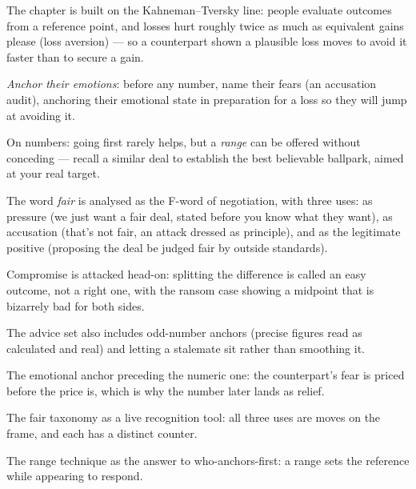 

\begin{distilled}
  \item The chapter is built on the Kahneman--Tversky line: people evaluate outcomes from a reference point, and losses hurt roughly twice as much as equivalent gains please (loss aversion) --- so a counterpart shown a plausible loss moves to avoid it faster than to secure a gain.
  \item \emph{Anchor their emotions}: before any number, name their fears (an accusation audit), anchoring their emotional state in preparation for a loss so they will jump at avoiding it.
  \item On numbers: going first rarely helps, but a \emph{range} can be offered without conceding --- recall a similar deal to establish the best believable ballpark, aimed at your real target.
  \item The word \emph{fair} is analysed as the F-word of negotiation, with three uses: as pressure (we just want a fair deal, stated before you know what they want), as accusation (that's not fair, an attack dressed as principle), and as the legitimate positive (proposing the deal be judged fair by outside standards).
  \item Compromise is attacked head-on: splitting the difference is called an easy outcome, not a right one, with the ransom case showing a midpoint that is bizarrely bad for both sides.
  \item The advice set also includes odd-number anchors (precise figures read as calculated and real) and letting a stalemate sit rather than smoothing it.
\end{distilled}

\begin{unique}
  \item The emotional anchor preceding the numeric one: the counterpart's fear is priced before the price is, which is why the number later lands as relief.
  \item The fair taxonomy as a live recognition tool: all three uses are moves on the frame, and each has a distinct counter.
  \item The range technique as the answer to who-anchors-first: a range sets the reference while appearing to respond.
\end{unique}
